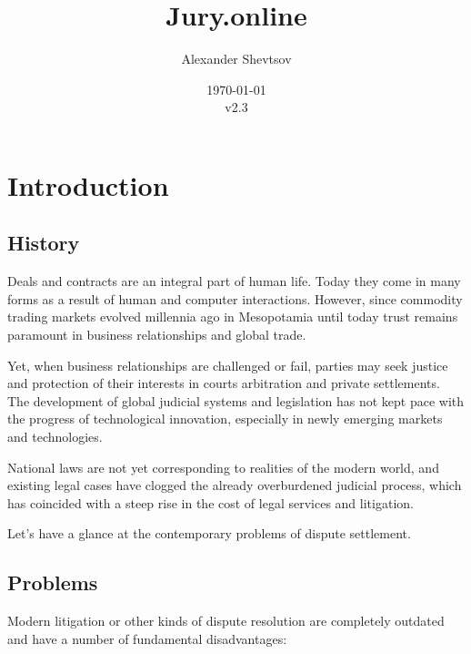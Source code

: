 \documentclass[12pt]{article}
\title{Jury.online}
\author{Alexander Shevtsov}
\date{\today\\v2.3}
\begin{document}
\maketitle
\tableofcontents 
\section{Introduction}
\subsection{History}
Deals and contracts are an integral part of human life. Today they come in many forms as a result of human and computer interactions.
However, since commodity trading markets evolved millennia ago in Mesopotamia until today trust remains paramount in business relationships
and global trade.

Yet, when business relationships are challenged or fail, parties may seek justice and  protection of their interests in courts arbitration
and private settlements. The development of global judicial systems and legislation has not kept pace with the progress of technological
innovation, especially in newly emerging markets and technologies. 

National laws are not yet corresponding to realities of the modern world, and existing legal cases have clogged the already overburdened
judicial process, which has coincided with a steep rise in the cost of legal services and litigation. 

Let’s have a glance at the contemporary problems of dispute settlement.

\subsection{Problems} Modern litigation or other kinds of dispute resolution are completely outdated and have a number of fundamental
disadvantages:
\end{document}
